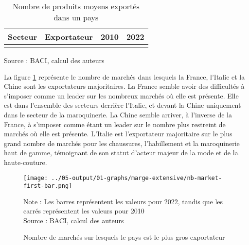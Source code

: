 \documentclass[french,10pt,a4paper]{article}
\begin{document}
\begin{table}[ht]
  \centering
  \begin{tabular}{|c|c|c|c|}
    \hline
   Secteur & Exportateur & 2010 & 2022 \\
    \hline
    \\
    \hline
  \end{tabular}
  \captionsetup{justification=raggedright,singlelinecheck=false, font=small}
  \caption*{Source : BACI, calcul des auteurs}
  \captionsetup{justification=centering, singlelinecheck=true, font=normalsize}
  \caption{Nombre de produits moyens exportés dans un pays}
  \label{tab:table-nb-mean-product-export}
\end{table}

La figure \ref{fig:nb-market-first-bar} représente le nombre de marchés dans lesquels la France, l'Italie et la Chine sont les exportateurs majoritaires. La France semble avoir des difficultés à s'imposer comme un leader sur les nombreux marchés où elle est présente. Elle est dans l'ensemble des secteurs derrière l'Italie, et devant la Chine uniquement dans le secteur de la maroquinerie. La Chine semble arriver, à l'inverse de la France, à s'imposer comme étant un leader sur le nombre plus restreint de marchés où elle est présente. L'Italie est l'exportateur majoritaire sur le plus grand nombre de marchés pour les chaussures, l'habillement et la maroquinerie haut de gamme, témoignant de son statut d'acteur majeur de la mode et de la haute-couture.


\begin{figure}[!h]
  \centering  \texttt{[image: ../05-output/01-graphs/marge-extensive/nb-market-first-bar.png]}
  \captionsetup{justification=justified, singlelinecheck=false, font=small}
  \caption*{Note : Les barres représentent les valeurs pour 2022, tandis que les carrés représentent les valeurs pour 2010 \\
  Source : BACI, calcul des auteurs}
  \captionsetup{justification=centering, singlelinecheck=true, font=normalsize}
  \caption{Nombre de marchés sur lesquels le pays est le plus gros exportateur}
  \label{fig:nb-market-first-bar}
\end{figure}
\end{document}
